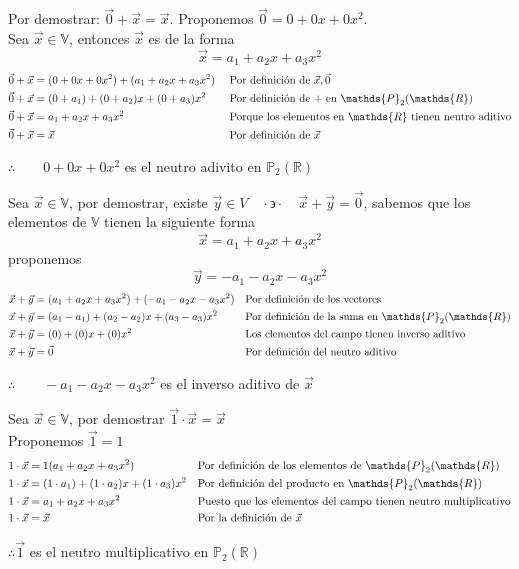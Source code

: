 \documentclass[letterpaper]{article}
\newcommand{\V}{\mathds{V}}
\newcommand{\tq}{ \quad \cdot  \backepsilon \cdot \quad }
\newcommand{\R}{\mathds{R}}
\newcommand{\Po}{\mathds{P}_2(\mathds{R})}
\renewcommand{\*}{\cdot}
\theoremstyle{definition}
\begin{document}
Por demostrar: $ \vec{0} + \vec{x} = \vec{x} $. Proponemos $ \vec{0} = 0 + 0x + 0x^2 $. \\
Sea $ \vec{x} \in \V $, entonces $ \vec{x} $ es de la forma \[ \vec{x} = a_1 + a_2x + a_3x^2  \]
\begin{align*}
	\vec{0} + \vec{x} &=  (0 + 0x + 0x^2) + (a_1 + a_2x + a_3x^2 )  && \text{ Por definición de $ \vec{x}, \vec{0} $}\\
	\vec{0} + \vec{x} &=  (0 + a_1) + (0 + a_2)x + (0 + a_3)x^2 && \text{ Por definición de  + en $ \Po $}\\
	\vec{0} + \vec{x} &=  a_1 +  a_2x + a_3x^2 && \text{ Porque los elementos en $ \R $ tienen neutro aditivo}\\
	\vec{0} + \vec{x} &= \vec{x} && \text{ Por definición de $ \vec{x} $}
\end{align*}
\begin{center}
	$ \therefore   \qquad 0 + 0x + 0x^2 $ es el neutro adivito en $ \Po $
\end{center}

Sea $ \vec{x} \in \V $, por demostrar, existe $ \vec{y} \in V  \tq \vec{x} +  \vec{y} = \vec{0}$, sabemos que  los elementos de $ \V $ tienen la siguiente forma\[  \vec{x} = a_1 + a_2x + a_3x^2 \] proponemos \[ \vec{y} = -a_1 - a_2x - a_3x^2 \]
\begin{align*}
	\vec{x} +  \vec{y} &= (a_1 + a_2x + a_3x^2) + (-a_1 - a_2x - a_3x^2 )&& \text{Por definición de los vectores}\\
	\vec{x} +  \vec{y} &= (a_1 - a_1) + (a_2 - a_2)x + (a_3 - a_3)x^2&& \text{Por definición de la suma en $ \Po $}\\
	\vec{x} +  \vec{y} &= (0) + (0)x + (0)x^2&& \text{Los elementos del campo tienen inverso aditivo}\\
	\vec{x} +  \vec{y} &= \vec{0}&& \text{Por definición del neutro aditivo}
\end{align*}
\begin{center}
	$ \therefore \qquad -a_1 - a_2x - a_3x^2  $ es el inverso aditivo de $ \vec{x} $
\end{center}

Sea $ \vec{x}  \in \V $, por demostrar $ \vec{1} \* \vec{x} = \vec{x}$\\ Proponemos $ \vec{1} = 1 $
\begin{align*}
	1\* \vec{x} &= 1(a_1 + a_2x + a_3x^2) && \text{Por definición de los elementos de $ \Po $}\\
	1\* \vec{x} &= (1 \* a_1) + (1 \* a_2)x + (1 \* a_3)x^2 && \text{Por  definición del producto en $ \Po $}\\
	1\* \vec{x} &= a_1 + a_2x + a_3x^2 && \text{Puesto que los elementos del campo tienen neutro multiplicativo}\\
	1\* \vec{x} &= \vec{x}&& \text{Por la definición de $ \vec{x} $}\\
\end{align*}
\begin{center}
	$ \therefore \vec{1} $ es el neutro multiplicativo en $ \Po $
\end{center}
\end{document}
